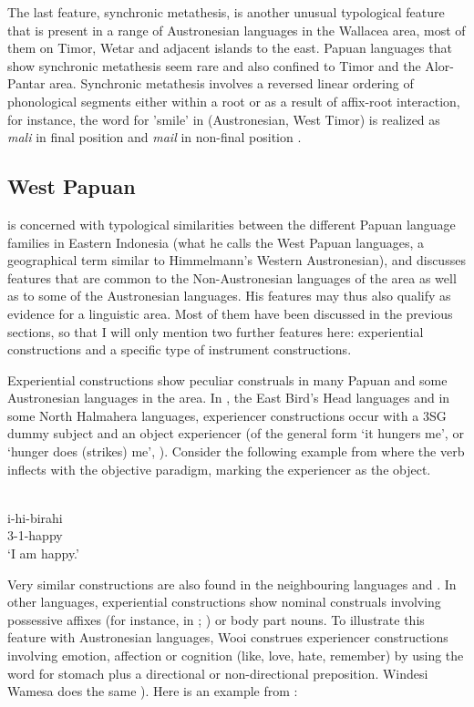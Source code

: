 The last feature, synchronic metathesis, is another unusual typological feature that is present in a range of Austronesian languages in the Wallacea area, most of them on Timor, Wetar and adjacent islands to the east. Papuan languages that show synchronic metathesis seem rare and also confined to Timor and the Alor-Pantar area. Synchronic metathesis involves a reversed linear ordering of phonological segments either within a root or as a result of affix-root interaction, for instance, the word for 'smile' in  (Austronesian, West Timor) is realized as \textit{mali} in final position and \textit{mail} in non-final position \citep[134ff.]{schapper2015wallacea}.

\subsection{West Papuan}\label{sec:westpapuan}

\citet{reesink2005west} is concerned with typological similarities between the different Papuan language families in Eastern Indonesia (what he calls the West Papuan languages, a geographical term similar to Himmelmann's Western Austronesian), and discusses features that are common to the Non-Austronesian languages of the area as well as to some of the Austronesian languages. His features may thus also qualify as evidence for a linguistic area. Most of them have been discussed in the previous sections, so that I will only mention two further features here: experiential constructions and a specific type of instrument constructions. 

Experiential constructions show peculiar construals in many Papuan and some Austronesian languages in the area. In , the East Bird's Head languages and in some North Halmahera languages, experiencer constructions occur with a 3SG dummy subject and an object experiencer  (of the general form `it hungers me', or `hunger does (strikes) me', \citealt[191]{reesink2005west}). Consider the following example from  where the verb inflects with the objective paradigm, marking the experiencer as the object.

\ea 
{}\\
\gll i-hi-birahi \\
3-1-happy \\
\glft `I am happy.'\\ 
\z

Very similar constructions are also found in the neighbouring languages  and . In other languages, experiential constructions show nominal construals involving possessive affixes (for instance, in ; \citealt[192]{reesink2005west}) or body part nouns. To illustrate this feature with Austronesian languages, Wooi construes experiencer constructions involving emotion, affection or cognition (like, love, hate, remember) by using the word for stomach plus a directional or non-directional preposition. Windesi Wamesa does the same \citep[154]{gasser2014windesi}). Here is an example from :

